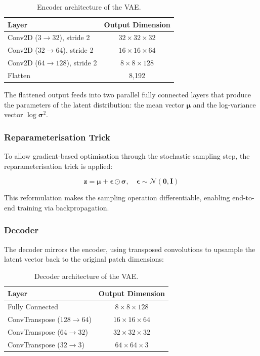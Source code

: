 \begin{table}[H]
\centering
\caption{Encoder architecture of the VAE.}
\label{tab:encoder}
\begin{tabular}{|l|c|}
\hline
\textbf{Layer} & \textbf{Output Dimension} \\ \hline
Conv2D ($3 \rightarrow 32$), stride 2 & $32 \times 32 \times 32$ \\ \hline
Conv2D ($32 \rightarrow 64$), stride 2 & $16 \times 16 \times 64$ \\ \hline
Conv2D ($64 \rightarrow 128$), stride 2 & $8 \times 8 \times 128$ \\ \hline
Flatten & 8{,}192 \\ \hline
\end{tabular}
\end{table}

The flattened output feeds into two parallel fully connected layers that produce the parameters of the latent distribution: the mean vector $\boldsymbol{\mu}$ and the log-variance vector $\log \boldsymbol{\sigma}^{2}$.

\subsubsection{Reparameterisation Trick}

To allow gradient-based optimisation through the stochastic sampling step, the reparameterisation trick is applied:

\begin{equation}
\mathbf{z} = \boldsymbol{\mu} + \boldsymbol{\epsilon} \odot \boldsymbol{\sigma}, \quad \boldsymbol{\epsilon} \sim \mathcal{N}(\mathbf{0}, \mathbf{I})
\end{equation}

This reformulation makes the sampling operation differentiable, enabling end-to-end training via backpropagation.

\subsubsection{Decoder}

The decoder mirrors the encoder, using transposed convolutions to upsample the latent vector back to the original patch dimensions:

\begin{table}[H]
\centering
\caption{Decoder architecture of the VAE.}
\label{tab:decoder}
\begin{tabular}{|l|c|}
\hline
\textbf{Layer} & \textbf{Output Dimension} \\ \hline
Fully Connected & $8 \times 8 \times 128$ \\ \hline
ConvTranspose ($128 \rightarrow 64$) & $16 \times 16 \times 64$ \\ \hline
ConvTranspose ($64 \rightarrow 32$) & $32 \times 32 \times 32$ \\ \hline
ConvTranspose ($32 \rightarrow 3$) & $64 \times 64 \times 3$ \\ \hline
\end{tabular}
\end{table}

